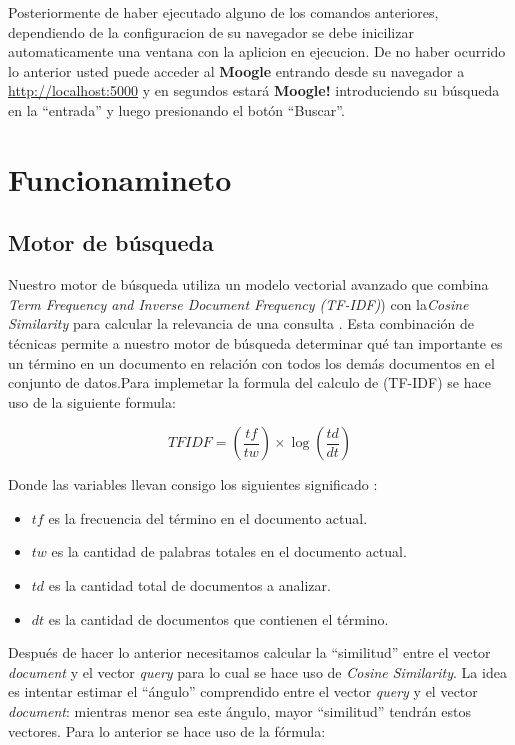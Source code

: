 \documentclass[a4paper, 12pt]{report}
\begin{document}
Posteriormente de haber ejecutado alguno de los comandos anteriores, dependiendo de la configuracion de su navegador se debe inicilizar
 automaticamente una ventana con la aplicion en ejecucion. De no haber ocurrido lo anterior usted puede acceder al {\bf Moogle} entrando desde su navegador a  
\href{http://localhost:5000}{http://localhost:5000} y en segundos estará {\bf Moogle!}
introduciendo su búsqueda en la ``entrada'' y luego presionando el botón
``Buscar''.

\section*{Funcionamineto}

\subsection*{Motor de búsqueda}


 Nuestro motor de búsqueda utiliza un modelo vectorial avanzado que combina {\it Term Frequency and Inverse Document Frequency (TF-IDF)})
 con la{\it Cosine
		Similarity} para calcular la relevancia de una consulta
. Esta combinación de técnicas permite a nuestro motor de búsqueda determinar qué tan importante es un término en 
un documento en relación con todos los demás documentos en el conjunto de datos.Para implemetar la formula del calculo de {(TF-IDF)} se hace uso 
de la siguiente formula:

\begin{equation}
	TFIDF = (\frac{tf}{tw}) \times \log(\frac{td}{dt})
\end{equation}

Donde las variables llevan consigo los siguientes significado :
\begin{itemize}
	\item $tf$ es la frecuencia del término en el documento actual.
	\item $tw$ es la cantidad de palabras totales en el documento actual.
	\item $td$ es la cantidad total de documentos a analizar.
	\item $dt$ es la cantidad de documentos que contienen el término.
\end{itemize}


Después de hacer lo anterior necesitamos calcular la ``similitud'' entre el
vector {\it document} y el vector {\it query} para lo cual se hace uso de {\it
		Cosine Similarity}. La idea es intentar estimar el ``ángulo'' comprendido entre
el vector {\it query} y el vector {\it document}: mientras menor sea este
ángulo, mayor ``similitud'' tendrán estos vectores. Para lo anterior se hace
uso de la fórmula:
\end{document}
